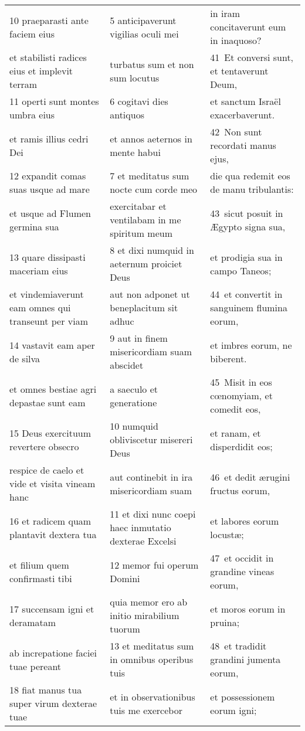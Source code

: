 \documentclass{article}
\begin{document}
\begin{longtable}{@{}p{}p{}p{}@{}}
10 praeparasti ante faciem eius	&	5 anticipaverunt vigilias oculi mei	&	in iram concitaverunt eum in inaquoso?	\\
et stabilisti radices eius et implevit terram	&	turbatus sum et non sum locutus	&	41 Et conversi sunt, et tentaverunt Deum,	\\
11 operti sunt montes umbra eius	&	6 cogitavi dies antiquos	&	et sanctum Israël exacerbaverunt.	\\
et ramis illius cedri Dei	&	et annos aeternos in mente habui	&	42 Non sunt recordati manus ejus,	\\
12 expandit comas suas usque ad mare	&	7 et meditatus sum nocte cum corde meo	&	die qua redemit eos de manu tribulantis:	\\
et usque ad Flumen germina sua	&	exercitabar et ventilabam in me spiritum meum	&	43 sicut posuit in Ægypto signa sua,	\\
13 quare dissipasti maceriam eius	&	8 et dixi numquid in aeternum proiciet Deus	&	et prodigia sua in campo Taneos;	\\
et vindemiaverunt eam omnes qui transeunt per viam	&	aut non adponet ut beneplacitum sit adhuc	&	44 et convertit in sanguinem flumina eorum,	\\
14 vastavit eam aper de silva	&	9 aut in finem misericordiam suam abscidet	&	et imbres eorum, ne biberent.	\\
et omnes bestiae agri depastae sunt eam	&	a saeculo et generatione	&	45 Misit in eos cœnomyiam, et comedit eos,	\\
15 Deus exercituum revertere obsecro	&	10 numquid obliviscetur misereri Deus	&	et ranam, et disperdidit eos;	\\
respice de caelo et vide et visita vineam hanc	&	aut continebit in ira misericordiam suam	&	46 et dedit ærugini fructus eorum,	\\
16 et radicem quam plantavit dextera tua	&	11 et dixi nunc coepi haec inmutatio dexterae Excelsi	&	et labores eorum locustæ;	\\
et filium quem confirmasti tibi	&	12 memor fui operum Domini	&	47 et occidit in grandine vineas eorum,	\\
17 succensam igni et deramatam	&	quia memor ero ab initio mirabilium tuorum	&	et moros eorum in pruina;	\\
ab increpatione faciei tuae pereant	&	13 et meditatus sum in omnibus operibus tuis	&	48 et tradidit grandini jumenta eorum,	\\
18 fiat manus tua super virum dexterae tuae	&	et in observationibus tuis me exercebor	&	et possessionem eorum igni;	\\

\end{longtable}
\end{document}
